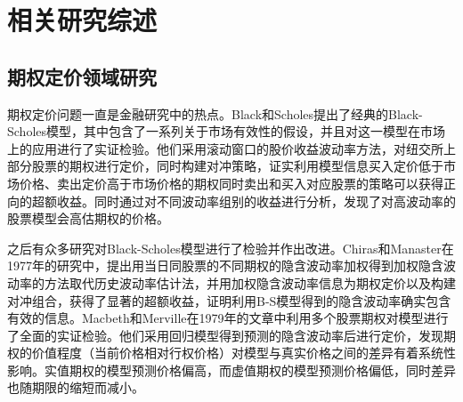 \chapter{相关研究综述}
\section{期权定价领域研究}
\par{
期权定价问题一直是金融研究中的热点。Black和Scholes提出了经典的Black-Scholes模型\cite{10.2307/1831029}，其中包含了一系列关于市场有效性的假设，并且对这一模型在市场上的应用进行了实证检验\cite{J-1972}。他们采用滚动窗口的股价收益波动率方法，对纽交所上部分股票的期权进行定价，同时构建对冲策略，证实利用模型信息买入定价低于市场价格、卖出定价高于市场价格的期权同时卖出和买入对应股票的策略可以获得正向的超额收益。同时通过对不同波动率组别的收益进行分析，发现了对高波动率的股票模型会高估期权的价格。}
\par{
之后有众多研究对Black-Scholes模型进行了检验并作出改进。Chiras和Manaster在1977年的研究中，提出用当日同股票的不同期权的隐含波动率加权得到加权隐含波动率的方法取代历史波动率估计法，并用加权隐含波动率信息为期权定价以及构建对冲组合，获得了显著的超额收益，证明利用B-S模型得到的隐含波动率确实包含有效的信息\cite{CHIRAS1978213}。Macbeth和Merville在1979年的文章中利用多个股票期权对模型进行了全面的实证检验\cite{Jame-1979}。他们采用回归模型得到预测的隐含波动率后进行定价，发现期权的价值程度（当前价格相对行权价格）对模型与真实价格之间的差异有着系统性影响。实值期权的模型预测价格偏高，而虚值期权的模型预测价格偏低，同时差异也随期限的缩短而减小。
}
